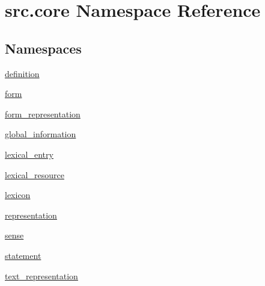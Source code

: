 \hypertarget{namespacesrc_1_1core}{\section{src.\+core Namespace Reference}
\label{namespacesrc_1_1core}
}
\subsection*{Namespaces}
\begin{DoxyCompactItemize}
\item 
 \hyperlink{namespacesrc_1_1core_1_1definition}{definition}
\item 
 \hyperlink{namespacesrc_1_1core_1_1form}{form}
\item 
 \hyperlink{namespacesrc_1_1core_1_1form__representation}{form\+\_\+representation}
\item 
 \hyperlink{namespacesrc_1_1core_1_1global__information}{global\+\_\+information}
\item 
 \hyperlink{namespacesrc_1_1core_1_1lexical__entry}{lexical\+\_\+entry}
\item 
 \hyperlink{namespacesrc_1_1core_1_1lexical__resource}{lexical\+\_\+resource}
\item 
 \hyperlink{namespacesrc_1_1core_1_1lexicon}{lexicon}
\item 
 \hyperlink{namespacesrc_1_1core_1_1representation}{representation}
\item 
 \hyperlink{namespacesrc_1_1core_1_1sense}{sense}
\item 
 \hyperlink{namespacesrc_1_1core_1_1statement}{statement}
\item 
 \hyperlink{namespacesrc_1_1core_1_1text__representation}{text\+\_\+representation}
\end{DoxyCompactItemize}
